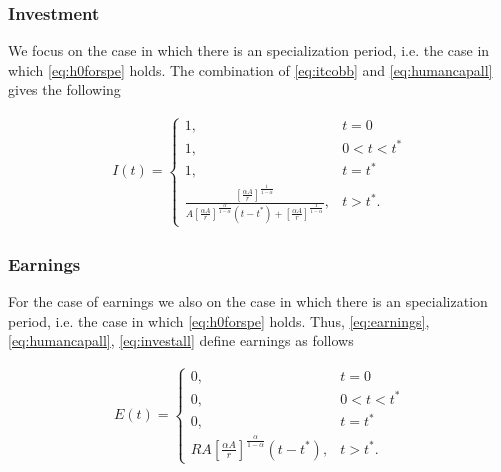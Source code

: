 \subsubsection{Investment}
We focus on the case in which there is an specialization period, i.e. the case in which \eqref{eq:h0forspe} holds. The combination of \eqref{eq:itcobb} and \eqref{eq:humancapall} gives the following

\begin{eqnarray}
I(t) =
\begin{cases}
1, & t = 0 \\
1, & 0 < t < t^* \\
1, & t = t^* \\
\frac{\left[ \frac{\alpha A}{r} \right]^{\frac{1}{1 - \alpha}}}{A \left[ \frac{\alpha A}{r} \right]^{\frac{ \alpha }{1 - \alpha}} \left( t - t^* \right) + \left[ \frac{\alpha A}{r} \right]^{\frac{1}{1 - \alpha}}}, & t > t^*. \label{eq:investall}
\end{cases}
\end{eqnarray}

\subsubsection{Earnings}
For the case of earnings we also on the case in which there is an specialization period, i.e. the case in which \eqref{eq:h0forspe} holds. Thus, \eqref{eq:earnings}, \eqref{eq:humancapall}, \eqref{eq:investall} define earnings as follows

\begin{eqnarray}
E(t) =
\begin{cases}
0, & t = 0 \\
0, & 0 < t < t^* \\
0, & t = t^* \\
RA \left[ \frac{\alpha A}{r} \right]^{\frac{\alpha}{1 - \alpha}} \left( t - t^* \right) , & t > t^*. \label{eq:earnsall}
\end{cases}
\end{eqnarray}

